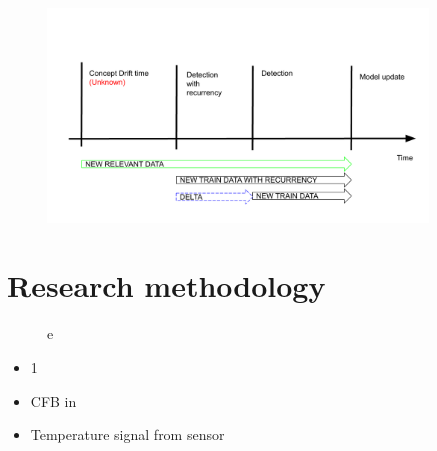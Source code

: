 \begin{figure}[htb!]
	\centering
	\includegraphics[width=0.9\textwidth]{images/google_slides/scheme_cd_recurrency}
  \caption{
	}\label{fig:research_question}
\end{figure}


\section{Research methodology}

\begin{figure}[htb!]
\centering

  \caption{e~\cite{nunamaker1990systems}}\label{fig:methodology}
\end{figure}

\begin{itemize}
  \item 1
  \item CFB in~\cite{x}
  \item Temperature signal from sensor
\end{itemize}

